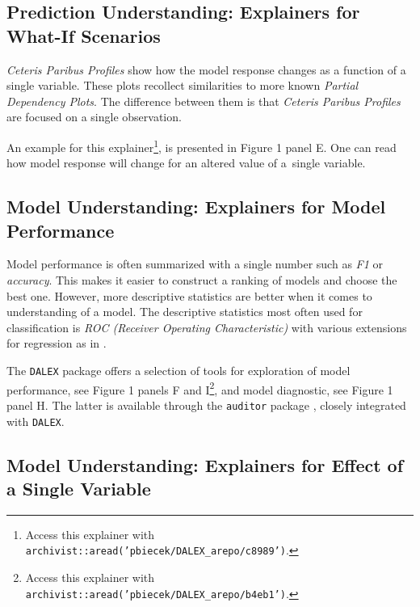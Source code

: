 \documentclass[twoside,11pt]{article}
\begin{document}
\subsection{Prediction Understanding: Explainers for What-If Scenarios}

\textit{Ceteris Paribus Profiles} show how the model response changes as a function of a single variable. These plots recollect similarities to more known \textit{Partial Dependency Plots}. The difference between them is that \textit{Ceteris Paribus Profiles} are focused on a single observation.

An example for this explainer\footnote{Access this explainer with \texttt{archivist::aread('pbiecek/DALEX\_arepo/c8989')}.}, is presented in Figure 1 panel E. One can read how model response will change for an altered value of a~single variable.%

\subsection{Model Understanding: Explainers for Model Performance}

Model performance is often summarized with a single number such as \textit{F1} or \textit{accuracy}. %
This makes it easier to construct a ranking of models and choose the best one. However, more descriptive statistics are better when it comes to understanding of a model. The descriptive statistics most often used for classification is \textit{ROC (Receiver Operating Characteristic)} with various extensions for regression as in \cite{RROC}. 

The \texttt{DALEX} package offers a selection of tools for exploration of model performance, see Figure 1 panels F and I\footnote{Access this explainer with  \texttt{archivist::aread('pbiecek/DALEX\_arepo/b4eb1')}.}, and model diagnostic, see Figure 1 panel H.
The latter is available through the \texttt{auditor} package \citep{auditor}, closely integrated with \texttt{DALEX}. 



\subsection{Model Understanding: Explainers for Effect of a Single Variable}
\label{sec:pdpexpl}
\end{document}
